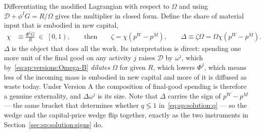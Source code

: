  Differentiating the modified Lagrangian with respect to $\Omega$ and using
$\mathcal D+\phi^IG=R/\Omega$ gives the multiplier in closed form. Define the share of material
input that is embodied in new capital,
\begin{align}
\chi &\equiv \frac{\Phi^IG}{R}\;\in\;\left[0,1\right),
\qquad\text{then}\qquad
\zeta = \chi\left(p^W-p^M\right),
\qquad
\Delta \equiv \zeta\Omega = \Omega\chi\left(p^W-p^M\right).
\label{eq:sp:versions:zeta}
\end{align}
$\Delta$ is the object that does all the work. Its interpretation is direct: spending one more unit
of the final good on any activity $j$ raises $\mathcal D$ by $\omega^j$, which
by~\eqref{eq:sp:versions:Omega-B} \emph{dilutes} $\Omega$ for given $R$, which lowers $\Phi^I$, which
means less of the incoming mass is embodied in new capital and more of it is diffused as waste
today. Under Version A the composition of final-good spending is therefore a genuine externality,
and $\Delta\omega^j$ is its size. Note that $\Delta$ carries the sign of $p^W-p^M$ --- the same
bracket that determines whether $q\lessgtr1$ in~\eqref{eq:sp:solution:q} --- so the wedge and the
capital-price wedge flip together, exactly as the two instruments in
Section~\ref{sec:sp:solution:signs} do.

